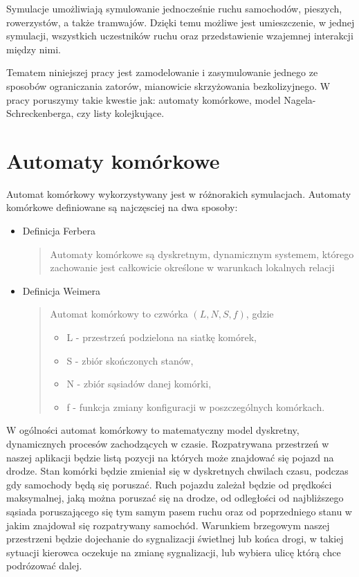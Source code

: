 \documentclass{sprawozdanie-agh}
\begin{document}
	Symulacje umożliwiają symulowanie jednocześnie ruchu samochodów, pieszych, rowerzystów, a także tramwajów. Dzięki temu możliwe jest umieszczenie, w jednej symulacji, wszystkich uczestników ruchu oraz przedstawienie wzajemnej interakcji między nimi.

	Tematem niniejszej pracy jest zamodelowanie i zasymulowanie jednego ze sposobów ograniczania zatorów, mianowicie skrzyżowania bezkolizyjnego. W pracy poruszymy takie kwestie jak: automaty komórkowe, model Nagela-Schreckenberga, czy listy kolejkujące.

	\section{Automaty komórkowe}

	Automat komórkowy wykorzystywany jest w różnorakich symulacjach. Automaty komórkowe definiowane są najczęsciej na dwa sposoby:

	\begin{itemize}
		\item Definicja Ferbera
		\begin{quote}
			Automaty komórkowe są dyskretnym, dynamicznym systemem, którego zachowanie jest całkowicie określone w warunkach lokalnych relacji
		\end{quote}
		\item Definicja Weimera
		\begin{quote}
			Automat komórkowy to czwórka $(L,N,S,f)$, gdzie
			\begin{itemize}
				\item L - przestrzeń podzielona na siatkę komórek,
				\item S - zbiór skończonych stanów,
				\item N - zbiór sąsiadów danej komórki,
				\item f - funkcja zmiany konfiguracji w poszczególnych komórkach.
			\end{itemize}
		\end{quote}
	\end{itemize}

	W ogólności automat komórkowy to matematyczny model dyskretny, dynamicznych procesów zachodzących w czasie. Rozpatrywana przestrzeń w naszej aplikacji będzie listą pozycji na których może znajdować się pojazd na drodze. Stan komórki będzie zmieniał się w dyskretnych chwilach czasu, podczas gdy samochody będą się poruszać. Ruch pojazdu zależał będzie od prędkości maksymalnej, jaką można poruszać się na drodze, od odległości od najbliższego sąsiada poruszającego się tym samym pasem ruchu oraz od poprzedniego stanu w jakim znajdował się rozpatrywany samochód. Warunkiem brzegowym naszej przestrzeni będzie dojechanie do sygnalizacji świetlnej lub końca drogi, w takiej sytuacji kierowca oczekuje na zmianę sygnalizacji, lub wybiera ulicę którą chce podrózować dalej.
\end{document}
